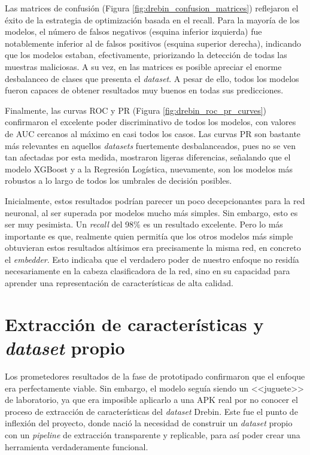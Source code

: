 
Las matrices de confusión (Figura \ref{fig:drebin_confusion_matrices}) reflejaron el éxito de la estrategia de optimización basada en el recall. Para la mayoría de los modelos, el número de falsos negativos (esquina inferior izquierda) fue notablemente inferior al de falsos positivos (esquina superior derecha), indicando que los modelos estaban, efectivamente, priorizando la detección de todas las muestras maliciosas. A su vez, en las matrices es posible apreciar el enorme desbalanceo de clases que presenta el \textit{dataset}. A pesar de ello, todos los modelos fueron capaces de obtener resultados muy buenos en todas sus predicciones.


Finalmente, las curvas ROC y PR (Figura \ref{fig:drebin_roc_pr_curves}) confirmaron el excelente poder discriminativo de todos los modelos, con valores de AUC cercanos al máximo en casi todos los casos. Las curvas PR son bastante más relevantes en aquellos \textit{datasets} fuertemente desbalanceados, pues no se ven tan afectadas por esta medida, mostraron ligeras diferencias, señalando que el modelo XGBoost y a la Regresión Logística, nuevamente, son los modelos más robustos a lo largo de todos los umbrales de decisión posibles.

Inicialmente, estos resultados podrían parecer un poco decepcionantes para la red neuronal, al ser superada por modelos mucho más simples. Sin embargo, esto es ser muy pesimista. Un \textit{recall} del 98\% es un resultado excelente. Pero lo más importante es que, realmente quien permitía que los otros modelos más simple obtuvieran estos resultados altísimos era precisamente la misma red, en concreto el \textit{embedder}. Esto indicaba que el verdadero poder de nuestro enfoque no residía necesariamente en la cabeza clasificadora de la red, sino en su capacidad para aprender una representación de características de alta calidad.

\section{Extracción de características y \textit{dataset} propio}

Los prometedores resultados de la fase de prototipado confirmaron que el enfoque era perfectamente viable. Sin embargo, el modelo seguía siendo un <<juguete>> de laboratorio, ya que era imposible aplicarlo a una APK real por no conocer el proceso de extracción de características del \textit{dataset} Drebin. Este fue el punto de inflexión del proyecto, donde nació la necesidad de construir un \textit{dataset} propio con un \textit{pipeline} de extracción transparente y replicable, para así poder crear una herramienta verdaderamente funcional.

